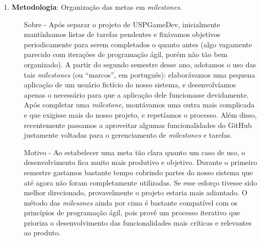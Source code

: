 \begin{enumerate}
    \item \textbf{Metodologia}: Organização das metas em \textit{milestones}.
      \begin{itemize}
        \item[Sobre -] Após separar o projeto de USPGameDev, inicialmente
          mantínhamos listas de tarefas pendentes e fixávamos objetivos
          periodicamente para serem completados o quanto antes (algo vagamente
          parecido com iterações de programação ágil, porém não tão bem
          organizado). A partir do segundo semestre desse ano, adotamos o
          uso das tais \textit{milestones} (ou ``marcos'', em português):
          elaborávamos uma pequena aplicação de um usuário fictício do nosso
          sistema, e desenvolvíamos apenas o necessário para que a aplicação
          dele funcionasse devidamente. Após completar uma \textit{milestone},
          montávamos uma outra mais complicada e que exigisse mais do nosso
          projeto, e repetíamos o processo. Além disso, recentemente passamos
          a aproveitar algumas funcionalidades do GitHub justamente voltadas
          para o gerenciamento de \textit{milestones} e tarefas.
        \item[Motivo -] Ao estabelecer uma meta tão clara quanto um caso de uso,
          o desenvolvimento fica muito mais produtivo e objetivo. Durante o
          primeiro semestre gastamos bastante tempo cobrindo partes do nosso
          sistema que até agora não foram completamente utilizadas. Se esse
          esforço tivesse sido melhor direcionado, provavelmente o projeto estaria
          mais adiantado. O método das \textit{milesones} ainda por cima é
          bastante compatível com os princípios de programação ágil, pois provê
          um processo iterativo que prioriza o desenvolvimento das funcionalidades
          mais críticas e relevantes ao produto.
      \end{itemize}


\end{enumerate}
